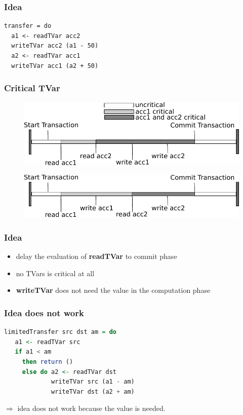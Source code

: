 \documentclass{beamer}
\newcommand{\code}[1]{\textbf{#1}}
\begin{document}
\begin{frame}[fragile]
\frametitle{Idea}
\begin{lstlisting}
transfer = do 
  a1 <- readTVar acc2
  writeTVar acc2 (a1 - 50)
  a2 <- readTVar acc1
  writeTVar acc1 (a2 + 50)
\end{lstlisting}
\end{frame}
  
     
  \begin{frame}
   \frametitle{Critical TVar}
   \begin{figure}
    \includegraphics[scale=0.7]{ressources/CriticalValue.pdf}
   \end{figure}
   \begin{figure}
    \includegraphics[scale=0.7]{ressources/CriticalValue2.pdf}
   \end{figure}
   \end{frame}

\begin{frame}
 \frametitle{Idea}
 \begin{itemize}\setlength\itemsep{1em}
  \item delay the evaluation of \code{readTVar} to commit phase
  \item no TVars is critical at all  
  \item \code{writeTVar} does not need the value in the computation phase
 \end{itemize}
\end{frame}
  
\begin{frame}[fragile]
   \frametitle{Idea does not work}
   \begin{lstlisting}[language=Haskell]
limitedTransfer src dst am = do
   a1 <- readTVar src
   if a1 < am
     then return ()
     else do a2 <- readTVar dst
             writeTVar src (a1 - am)
             writeTVar dst (a2 + am)
   \end{lstlisting}
   \vfill
   $\Rightarrow$ idea does not work because the value is needed.
\end{frame}
\end{document}
